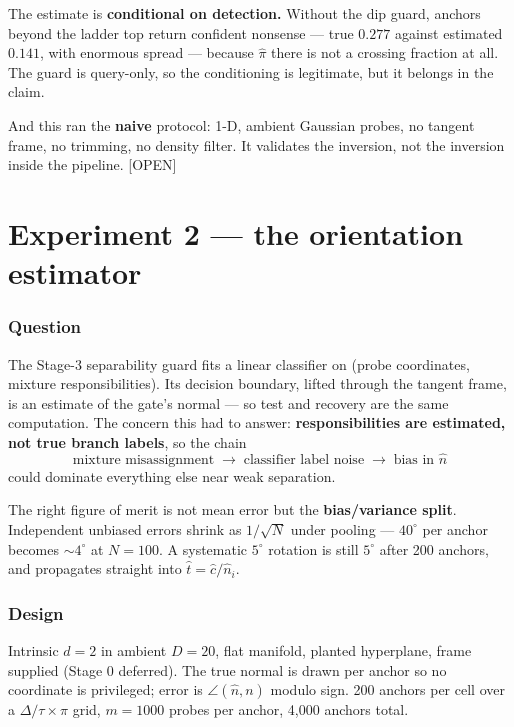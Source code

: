 \documentclass[11pt]{article}
\newcommand{\pihat}{\hat{\pi}}
\newcommand{\nhat}{\hat{n}}
\newcommand{\chat}{\hat{c}}
\newcommand{\that}{\hat{t}}
\newcommand{\provtag}[2]{{\footnotesize\sffamily\textcolor{#1}{[#2]}}}
\newcommand{\OPENT}{\provtag{openamber}{OPEN}}
\begin{document}
The estimate is \textbf{conditional on detection.} Without the dip guard, anchors beyond the
ladder top return confident nonsense --- true $0.277$ against estimated $0.141$, with enormous
spread --- because $\pihat$ there is not a crossing fraction at all. The guard is query-only, so
the conditioning is legitimate, but it belongs in the claim.

And this ran the \textbf{naive} protocol: 1-D, ambient Gaussian probes, no tangent frame, no
trimming, no density filter. It validates the inversion, not the inversion inside the pipeline.
\OPENT

\part{Experiment 2 --- the orientation estimator}

\section{Question}

The Stage-3 separability guard fits a linear classifier on (probe coordinates, mixture
responsibilities). Its decision boundary, lifted through the tangent frame, is an estimate of the
gate's normal --- so test and recovery are the same computation. The concern this had to answer:
\textbf{responsibilities are estimated, not true branch labels}, so the chain
\[
  \text{mixture misassignment} \;\to\; \text{classifier label noise} \;\to\; \text{bias in } \nhat
\]
could dominate everything else near weak separation.

\begin{claimbox}
\noindent The right figure of merit is not mean error but the \textbf{bias/variance split}.
Independent unbiased errors shrink as $1/\sqrt{N}$ under pooling --- $40^\circ$ per anchor
becomes ${\sim}4^\circ$ at $N=100$. A systematic $5^\circ$ rotation is still $5^\circ$ after 200
anchors, and propagates straight into $\that = \chat/\nhat_i$.
\end{claimbox}

\section{Design}

Intrinsic $d = 2$ in ambient $D = 20$, flat manifold, planted hyperplane, frame supplied
(Stage 0 deferred). The true normal is drawn per anchor so no coordinate is privileged; error is
$\angle(\nhat, n)$ modulo sign. 200 anchors per cell over a $\Delta/\tau \times \pi$ grid,
$m = 1000$ probes per anchor, 4{,}000 anchors total.
\end{document}
